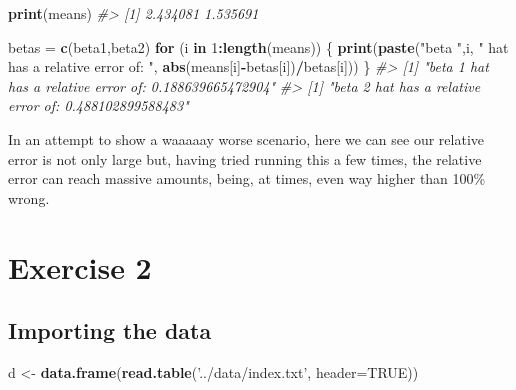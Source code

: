 \documentclass[]{article}
\newenvironment{Shaded}{\begin{snugshade}}{\end{snugshade}}
\newcommand{\CommentTok}[1]{\textcolor[rgb]{0.56,0.35,0.01}{\textit{#1}}}
\newcommand{\ControlFlowTok}[1]{\textcolor[rgb]{0.13,0.29,0.53}{\textbf{#1}}}
\newcommand{\DataTypeTok}[1]{\textcolor[rgb]{0.13,0.29,0.53}{#1}}
\newcommand{\DecValTok}[1]{\textcolor[rgb]{0.00,0.00,0.81}{#1}}
\newcommand{\KeywordTok}[1]{\textcolor[rgb]{0.13,0.29,0.53}{\textbf{#1}}}
\newcommand{\NormalTok}[1]{#1}
\newcommand{\OperatorTok}[1]{\textcolor[rgb]{0.81,0.36,0.00}{\textbf{#1}}}
\newcommand{\OtherTok}[1]{\textcolor[rgb]{0.56,0.35,0.01}{#1}}
\newcommand{\StringTok}[1]{\textcolor[rgb]{0.31,0.60,0.02}{#1}}
\begin{document}
\begin{Shaded}
\begin{Highlighting}[]
\KeywordTok{print}\NormalTok{(means)}
\CommentTok{#> [1] 2.434081 1.535691}
\end{Highlighting}
\end{Shaded}

\begin{Shaded}
\begin{Highlighting}[]
\NormalTok{betas =}\StringTok{ }\KeywordTok{c}\NormalTok{(beta1,beta2)}
\ControlFlowTok{for}\NormalTok{ (i }\ControlFlowTok{in} \DecValTok{1}\OperatorTok{:}\KeywordTok{length}\NormalTok{(means)) \{}
    \KeywordTok{print}\NormalTok{(}\KeywordTok{paste}\NormalTok{(}\StringTok{"beta "}\NormalTok{,i, }\StringTok{" hat has a relative error of: "}\NormalTok{, }\KeywordTok{abs}\NormalTok{(means[i]}\OperatorTok{-}\NormalTok{betas[i])}\OperatorTok{/}\NormalTok{betas[i]))}
\NormalTok{\}}
\CommentTok{#> [1] "beta  1  hat has a relative error of:  0.188639665472904"}
\CommentTok{#> [1] "beta  2  hat has a relative error of:  0.488102899588483"}
\end{Highlighting}
\end{Shaded}

In an attempt to show a waaaaay worse scenario, here we can see our
relative error is not only large but, having tried running this a few
times, the relative error can reach massive amounts, being, at times,
even way higher than 100\% wrong.

\newpage

\hypertarget{exercise-2}{%
\section{Exercise 2}\label{exercise-2}}

\hypertarget{importing-the-data}{%
\subsection{Importing the data}\label{importing-the-data}}

\begin{Shaded}
\begin{Highlighting}[]
\NormalTok{d <-}\StringTok{ }\KeywordTok{data.frame}\NormalTok{(}\KeywordTok{read.table}\NormalTok{(}\StringTok{'../data/index.txt'}\NormalTok{, }\DataTypeTok{header=}\OtherTok{TRUE}\NormalTok{))}
\end{Highlighting}
\end{Shaded}
\end{document}
